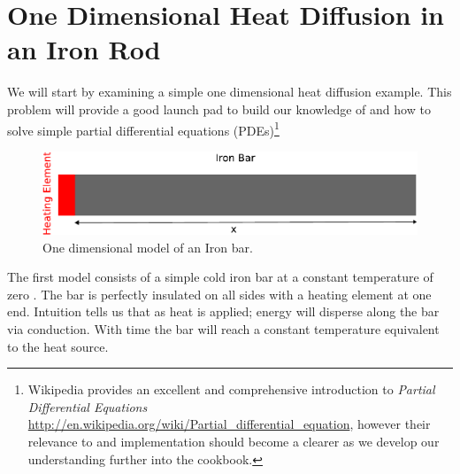 
%
%
%

\section{One Dimensional Heat Diffusion in an Iron Rod}
We will start by examining a simple one dimensional heat diffusion example. This problem will provide a good launch pad to build our knowledge of \esc and how to solve simple partial differential equations (PDEs)\footnote{Wikipedia provides an excellent and comprehensive introduction to \textit{Partial Differential Equations} \url{http://en.wikipedia.org/wiki/Partial_differential_equation}, however their relevance to \esc and implementation should become a clearer as we develop our understanding further into the cookbook.}

\begin{figure}[h!]
\centerline{\includegraphics[width=4.in]{figures/onedheatdiff}}
\caption{One dimensional model of an Iron bar.}
\label{fig:onedhdmodel}
\end{figure}
The first model consists of a simple cold iron bar at a constant temperature of zero . The bar is perfectly insulated on all sides with a heating element at one end. Intuition tells us that as heat is applied; energy will disperse along the bar via conduction. With time the bar will reach a constant temperature equivalent to the heat source.


